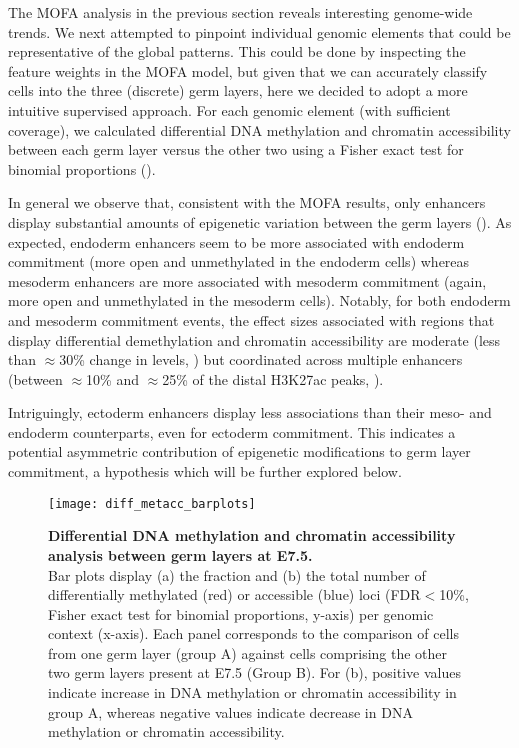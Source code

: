 The MOFA analysis in the previous section reveals interesting genome-wide trends. We next attempted to pinpoint individual genomic elements that could be representative of the global patterns. This could be done by inspecting the feature weights in the MOFA model, but given that we can accurately classify cells into the three (discrete) germ layers, here we decided to adopt a more intuitive supervised approach. For each genomic element (with sufficient coverage), we calculated differential DNA methylation and chromatin accessibility between each germ layer versus the other two using a Fisher exact test for binomial proportions ().

In general we observe that, consistent with the MOFA results, only enhancers display substantial amounts of epigenetic variation between the germ layers (). As expected, endoderm enhancers seem to be more associated with endoderm commitment (more open and unmethylated in the endoderm cells) whereas mesoderm enhancers are more associated with mesoderm commitment (again, more open and unmethylated in the mesoderm cells). Notably, for both endoderm and mesoderm commitment events, the effect sizes associated with regions that display differential demethylation and chromatin accessibility are moderate (less than $\approx$30\% change in levels, ) but coordinated across multiple enhancers (between $\approx$10\% and $\approx$25\% of the distal H3K27ac peaks, ).

Intriguingly, ectoderm enhancers display less associations than their meso- and endoderm counterparts, even for ectoderm commitment. This indicates a potential asymmetric contribution of epigenetic modifications to germ layer commitment, a hypothesis which will be further explored below.\\


\begin{figure}[H]
	\centering
	\texttt{[image: diff\_metacc\_barplots]}
	\caption[]{
	\textbf{Differential DNA methylation and chromatin accessibility analysis between germ layers at E7.5.} \\
	Bar plots display (a) the fraction and (b) the total number of differentially methylated (red) or accessible (blue) loci (FDR$<$10\%, Fisher exact test for binomial proportions, y-axis) per genomic context (x-axis). Each panel corresponds to the comparison of cells from one germ layer (group A) against cells comprising the other two germ layers present  at E7.5 (Group B). For (b), positive values indicate increase in DNA methylation or chromatin accessibility in group A, whereas negative values indicate decrease in DNA methylation or chromatin accessibility.}
	\label{fig:diff_metacc_barplots}
\end{figure}


